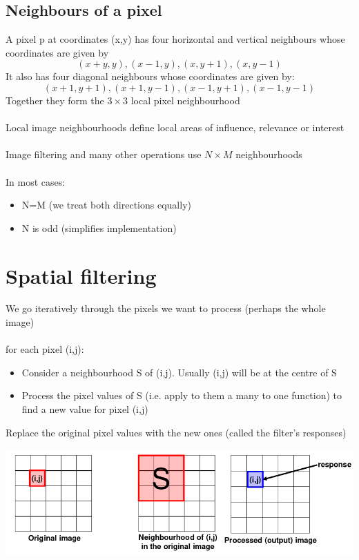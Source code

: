 \documentclass{article}[18pt]
\begin{document}
\subsection{Neighbours of a pixel}
A pixel p at coordinates (x,y) has four horizontal and vertical neighbours whose coordinates are given by
$$(x+y,y), (x-1,y), (x,y+1), (x,y-1)$$
It also has four diagonal neighbours whose coordinates are given by:
$$(x+1,y+1),(x+1,y-1),(x-1,y+1),(x-1,y-1)$$
Together they form the $3\times 3$ local pixel neighbourhood\\
\\
Local image neighbourhoods define local areas of influence, relevance or interest\\
\\
Image filtering and many other operations use $N\times M$ neighbourhoods\\
\\
In most cases:
\begin{itemize}
	\item N=M (we treat both directions equally)
	\item N is odd (simplifies implementation)
\end{itemize}
\section{Spatial filtering}
We go iteratively through the pixels we want to process (perhaps the whole image)\\
\\
for each pixel (i,j):
\begin{itemize}
	\item Consider a neighbourhood S of (i,j). Usually (i,j) will be at the centre of S
	\item Process the pixel values of S (i.e. apply to them a many to one function) to find a new value for pixel (i,j)
\end{itemize}
Replace the original pixel values with the new ones (called the filter's responses)
\begin{center}
	\includegraphics[scale=0.7]{neighbourhood}
\end{center}
\end{document}
